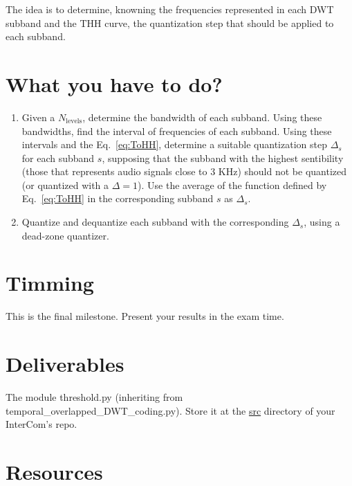 The idea is to determine, knowning the frequencies represented in each
DWT subband and the THH curve, the quantization step that should be
applied to each subband.

\section{What you have to do?}

  
\begin{enumerate}
\item Given a $N_{\text{levels}}$, determine the bandwidth of each
  subband. Using these bandwidths, find the interval of frequencies of
  each subband. Using these intervals and the Eq.~\ref{eq:ToHH},
  determine a suitable quantization step $\Delta_s$ for each subband
  $s$, supposing that the subband with the highest sentibility (those
  that represents audio signals close to $3$ KHz) should not be
  quantized (or quantized with a $\Delta=1$). Use the average of the
  function defined by Eq.~\ref{eq:ToHH} in the corresponding subband
  $s$ as $\Delta_s$.
\item Quantize and dequantize each subband with the corresponding
  $\Delta_s$, using a dead-zone quantizer.
\end{enumerate}

\section{Timming}

This is the final milestone. Present your results in the exam time.

\section{Deliverables}

The module threshold.py (inheriting from temporal\_overlapped\_DWT\_coding.py). Store it at the
\href{https://github.com/Tecnologias-multimedia/intercom/src}{src}
  directory of your InterCom's repo.

\section{Resources}



